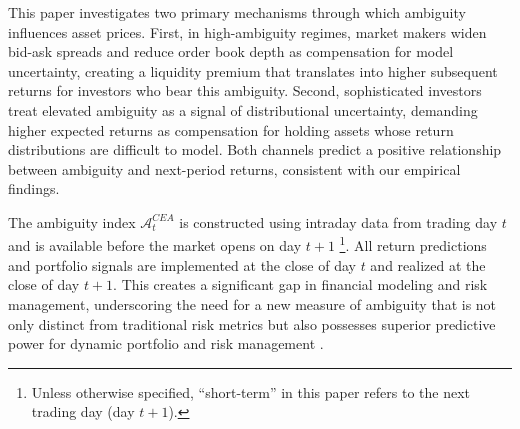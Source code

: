 \documentclass[preprint,12pt,authoryear]{elsarticle}
\renewcommand{\textcolor}[2]{\begingroup\color{#1}#2\endgroup}
\begin{document}

\textcolor{red}{This paper investigates two primary mechanisms through which ambiguity influences asset prices. First, in high-ambiguity regimes, market makers widen bid-ask spreads and reduce order book depth as compensation for model uncertainty, creating a liquidity premium that translates into higher subsequent returns for investors who bear this ambiguity. Second, sophisticated investors treat elevated ambiguity as a signal of distributional uncertainty, demanding higher expected returns as compensation for holding assets whose return distributions are difficult to model. Both channels predict a positive relationship between ambiguity and next-period returns, consistent with our empirical findings.}

\textcolor{red}{The ambiguity index $\mathcal{A}^{CEA}_t$ is constructed using intraday data from trading day $t$ and is available before the market opens on day $t+1$ \footnote{Unless otherwise specified, ``short-term'' in this paper refers to the next trading day (day $t+1$).}. All return predictions and portfolio signals are implemented at the close of day $t$ and realized at the close of day $t+1$.} This creates a significant gap in financial modeling and risk management, underscoring the need for a new measure of ambiguity that is not only distinct from traditional risk metrics but also possesses superior predictive power for dynamic portfolio and risk management \citep{Bollerslev1988}.


\end{document}
